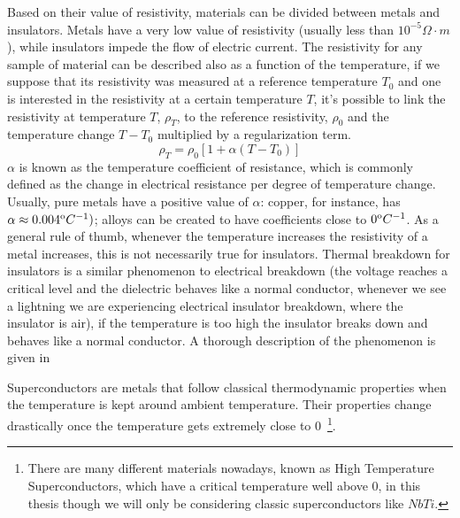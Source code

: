 Based on their value of resistivity, materials can be divided between metals and insulators. Metals
have a very low value of resistivity (usually less than $10^{-5}\Omega\cdot m$), while insulators impede the
flow of electric current. The resistivity for any sample of material can be described also as a
function of the temperature, if we suppose that its resistivity was measured at a reference
temperature $T_0$ and one is interested in the resistivity at a certain temperature $T$, it's
possible to link the resistivity at temperature $T$, $\rho_T$, to the reference resistivity,
$\rho_0$ and the temperature change $T - T_0$ multiplied by a regularization term.
\begin{equation}
	\label{eq:resistivity-func-of-temp}
	\rho_T = \rho_0[1 + \alpha(T - T_0)]
\end{equation}
$\alpha$ is known as the temperature coefficient of resistance, which is commonly defined as the
change in electrical resistance per degree of temperature change. Usually, pure metals have a
positive value of $\alpha$: copper, for instance, has $\alpha \approx 0.004^\text{o}C^{-1})$; alloys can be
created to have coefficients close to $0^\text{o}C^{-1}$. As a general rule of thumb, whenever the
temperature increases the resistivity of a metal increases, this is not necessarily
true for insulators. Thermal breakdown for insulators is a similar phenomenon to electrical
breakdown (the voltage reaches a critical level and the dielectric behaves like a normal conductor,
whenever we see a lightning we are experiencing electrical insulator breakdown, where the insulator
is air), if the temperature is too high the insulator breaks down and behaves like a normal conductor. A thorough description of the phenomenon is given in~\cite{kuvyrkin2022}

Superconductors are metals that follow classical thermodynamic properties when the temperature is
kept around ambient temperature. Their properties change drastically once the temperature gets
extremely close to $0$\K~\footnote{There are many different materials nowadays, known as High Temperature
	Superconductors, which have a critical temperature well above $0$\K, in this thesis though we will
	only be considering classic superconductors like $NbTi$.
}.

